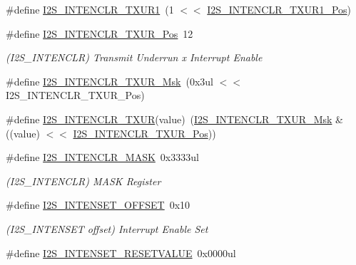 \begin{DoxyCompactItemize}
\#define \mbox{\hyperlink{group___s_a_m_d21___i2_s_gac20cff666a30b67d4b34d20785cca674}{I2\+S\+\_\+\+I\+N\+T\+E\+N\+C\+L\+R\+\_\+\+T\+X\+U\+R1}}~(1 $<$$<$ \mbox{\hyperlink{group___s_a_m_d21___i2_s_ga8e6e57c754c211623784759da161c01d}{I2\+S\+\_\+\+I\+N\+T\+E\+N\+C\+L\+R\+\_\+\+T\+X\+U\+R1\+\_\+\+Pos}})
\item 
\#define \mbox{\hyperlink{group___s_a_m_d21___i2_s_ga3532309a5035b5752b503639978a9e62}{I2\+S\+\_\+\+I\+N\+T\+E\+N\+C\+L\+R\+\_\+\+T\+X\+U\+R\+\_\+\+Pos}}~12
\begin{DoxyCompactList}\small\item\em (I2\+S\+\_\+\+I\+N\+T\+E\+N\+C\+LR) Transmit Underrun x Interrupt Enable \end{DoxyCompactList}\item 
\#define \mbox{\hyperlink{group___s_a_m_d21___i2_s_ga6ee31ccc96227d279f7ee4655c1fb76c}{I2\+S\+\_\+\+I\+N\+T\+E\+N\+C\+L\+R\+\_\+\+T\+X\+U\+R\+\_\+\+Msk}}~(0x3ul $<$$<$ I2\+S\+\_\+\+I\+N\+T\+E\+N\+C\+L\+R\+\_\+\+T\+X\+U\+R\+\_\+\+Pos)
\item 
\#define \mbox{\hyperlink{group___s_a_m_d21___i2_s_ga4054401c4bbb7f1e7f1f3c5815f2c6fe}{I2\+S\+\_\+\+I\+N\+T\+E\+N\+C\+L\+R\+\_\+\+T\+X\+UR}}(value)~(\mbox{\hyperlink{group___s_a_m_d21___i2_s_ga6ee31ccc96227d279f7ee4655c1fb76c}{I2\+S\+\_\+\+I\+N\+T\+E\+N\+C\+L\+R\+\_\+\+T\+X\+U\+R\+\_\+\+Msk}} \& ((value) $<$$<$ \mbox{\hyperlink{group___s_a_m_d21___i2_s_ga3532309a5035b5752b503639978a9e62}{I2\+S\+\_\+\+I\+N\+T\+E\+N\+C\+L\+R\+\_\+\+T\+X\+U\+R\+\_\+\+Pos}}))
\item 
\#define \mbox{\hyperlink{group___s_a_m_d21___i2_s_ga7511aeab3570168deef863a0945ff013}{I2\+S\+\_\+\+I\+N\+T\+E\+N\+C\+L\+R\+\_\+\+M\+A\+SK}}~0x3333ul
\begin{DoxyCompactList}\small\item\em (I2\+S\+\_\+\+I\+N\+T\+E\+N\+C\+LR) M\+A\+SK Register \end{DoxyCompactList}\item 
\#define \mbox{\hyperlink{group___s_a_m_d21___i2_s_ga4f7799200879d836b56557cc501fc86c}{I2\+S\+\_\+\+I\+N\+T\+E\+N\+S\+E\+T\+\_\+\+O\+F\+F\+S\+ET}}~0x10
\begin{DoxyCompactList}\small\item\em (I2\+S\+\_\+\+I\+N\+T\+E\+N\+S\+ET offset) Interrupt Enable Set \end{DoxyCompactList}\item 
\#define \mbox{\hyperlink{group___s_a_m_d21___i2_s_gaf0d24a1632b21dc544a62f9ba89478e3}{I2\+S\+\_\+\+I\+N\+T\+E\+N\+S\+E\+T\+\_\+\+R\+E\+S\+E\+T\+V\+A\+L\+UE}}~0x0000ul
$$
\end{DoxyCompactItemize}
